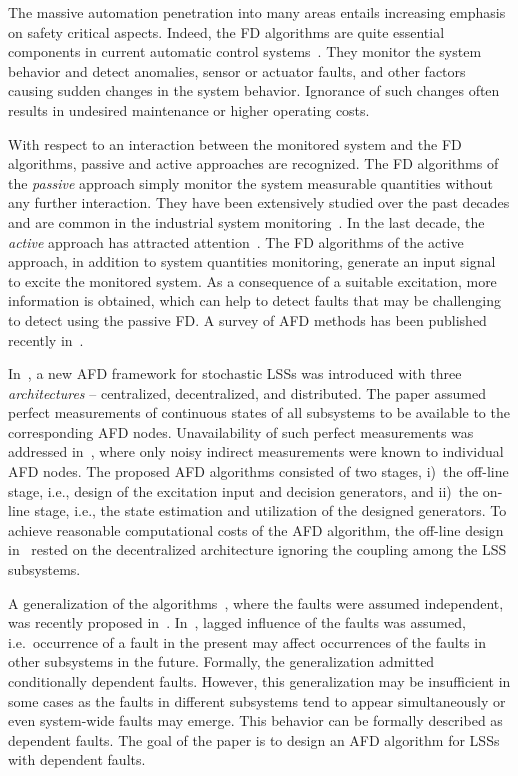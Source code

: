 \documentclass[conference,10pt]{IEEEtran}
\begin{document}
The massive automation penetration into many areas entails increasing emphasis on safety critical aspects. 
Indeed, the FD algorithms are quite essential components in current automatic control systems~\cite{Severson2015:cp:SAFEPROCESS}. 
They monitor the system behavior and detect anomalies, sensor or actuator faults, and other factors causing sudden changes in the system behavior. 
Ignorance of such changes often results in undesired maintenance or higher operating costs.

With respect to an interaction between the monitored system and the FD algorithms, passive and active approaches are recognized. 
The FD algorithms of the \textit{passive} approach simply monitor the system measurable quantities without any further interaction. 
They have been extensively studied over the past decades and are common in the industrial system monitoring~\cite{Simani2003:b,Blanke2016:b}. 
In the last decade, the \textit{active} approach has attracted attention~\cite{Niemann2005:cp:ACC,Raimondo2016:cp:CDC}. 
The FD algorithms of the active approach, in addition to system quantities monitoring, generate an input signal to excite the monitored system. 
As a consequence of a suitable excitation, more information  is obtained, which can help to detect faults that may be challenging to detect using the passive FD\@. A survey of AFD methods has been published recently in~\cite{HeMe:19}.

In~\cite{Puncochar2019:cp:ACC}, a new AFD framework for stochastic LSSs was introduced with three \emph{architectures} -- centralized, decentralized, and distributed. 
The paper assumed perfect measurements of continuous states of all subsystems to be available to the corresponding AFD nodes. 
Unavailability of such perfect measurements was addressed in~\cite{Straka2019:cp:FUSION}, where only noisy indirect measurements were known to individual AFD nodes. 
The proposed AFD algorithms consisted of two stages, i)~the off-line stage, i.e., design of the excitation input and decision generators, and ii)~the on-line stage, i.e., the state estimation and utilization of the designed generators.
To achieve reasonable computational costs of the AFD algorithm, the off-line design in~\cite{Puncochar2019:cp:ACC,Straka2019:cp:FUSION} rested on the decentralized architecture ignoring the coupling among the LSS subsystems. 

A generalization of the algorithms~\cite{Puncochar2019:cp:ACC,Straka2019:cp:FUSION}, where the faults were assumed independent, was recently proposed in~\cite{StraPu:20}.
In~\cite{StraPu:20}, lagged influence of the faults was assumed, i.e.\ occurrence of a fault in the present may affect occurrences of the faults in other subsystems in the future. 
Formally, the generalization admitted conditionally dependent faults.
However, this generalization may be insufficient in some cases as the faults in different subsystems tend to appear simultaneously or even system-wide faults may emerge. 
This behavior can be formally described as dependent faults.
The goal of the paper is to design an AFD algorithm for LSSs with dependent faults.
\end{document}
